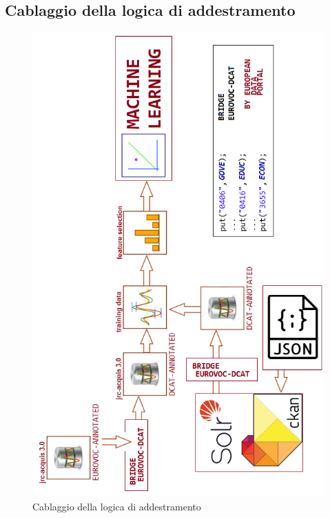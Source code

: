 \documentclass{article}
\theoremstyle{plain}
\theoremstyle{definition}
\begin{document}
\subsection{Cablaggio della logica di addestramento}
\begin{figure}[htbp]
\begin{center}
\includegraphics[scale=0.70]{img/td2.png}
\caption{Cablaggio della logica di addestramento}
\end{center}
\end{figure}

\newpage
\end{document}
